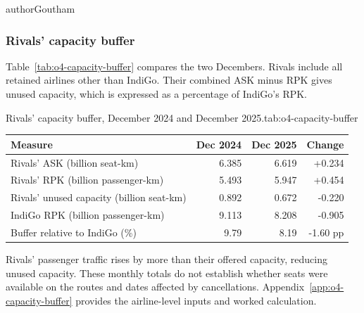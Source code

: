 \begin{mergedcontribution}{authorGoutham}
\subsubsection{Rivals' capacity buffer}
Table~\ref{tab:o4-capacity-buffer} compares the two Decembers. Rivals include all retained airlines other than IndiGo. Their combined ASK minus RPK gives unused capacity, which is expressed as a percentage of IndiGo's RPK.

\begin{resultstable}{Rivals' capacity buffer, December 2024 and December 2025.}{tab:o4-capacity-buffer}
\centering
\begin{tabularx}{\linewidth}{|>{\raggedright\arraybackslash}X|r|r|r|}
\hline
\textbf{Measure} & \textbf{Dec 2024} & \textbf{Dec 2025} & \textbf{Change} \\
\hline
Rivals' ASK (billion seat-km) & 6.385 & 6.619 & +0.234 \\
\hline
Rivals' RPK (billion passenger-km) & 5.493 & 5.947 & +0.454 \\
\hline
Rivals' unused capacity (billion seat-km) & 0.892 & 0.672 & -0.220 \\
\hline
IndiGo RPK (billion passenger-km) & 9.113 & 8.208 & -0.905 \\
\hline
Buffer relative to IndiGo (\%) & 9.79 & 8.19 & -1.60 pp \\
\hline
\end{tabularx}
\par
{}
\end{resultstable}

Rivals' passenger traffic rises by more than their offered capacity, reducing unused capacity. These monthly totals do not establish whether seats were available on the routes and dates affected by cancellations. Appendix~\ref{app:o4-capacity-buffer} provides the airline-level inputs and worked calculation.
\end{mergedcontribution}
